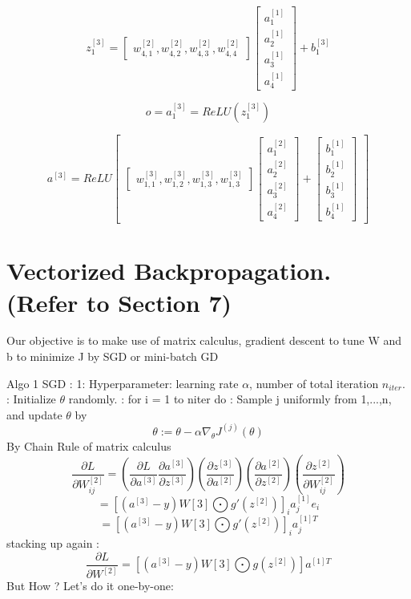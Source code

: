 \documentclass{article}
\begin{document}
\[
z_1^{[3]}=
\begin{bmatrix}
w_{4,1}^{[2]},w_{4,2}^{[2]},w_{4,3}^{[2]},w_{4,4}^{[2]}
\end{bmatrix}
\begin{bmatrix}
a_1^{[1]} \\ a_2^{[1]} \\ a_3^{[1]} \\ a_4^{[1]}
\end{bmatrix}
+ b_1^{[3]}
\]

\[ o = a_1^{[3]} = ReLU( z_1^{[3]}) \]

\[a^{[3]} = ReLU 
\begin{bmatrix}
\begin{bmatrix}
w_{1,1}^{[3]},w_{1,2}^{[3]},w_{1,3}^{[3]},w_{1,3}^{[3]}
\end{bmatrix}
\begin{bmatrix}
a_1^{[2]} \\ a_2^{[2]} \\ a_3^{[2]} \\ a_4^{[2]}
\end{bmatrix} +
\begin{bmatrix}
b_1^{[1]} \\ b_2^{[1]} \\ b_3^{[1]} \\ b_4^{[1]}
\end{bmatrix} 
\end{bmatrix}
\]




\section{Vectorized Backpropagation. (Refer to Section 7)}
Our objective is to make use of matrix calculus, gradient descent to tune W and b to minimize J by SGD or mini-batch GD \newline

Algo 1 SGD : 
 1: Hyperparameter: learning rate \(\alpha\), number of total iteration \(n_{iter}\). : Initialize \(\theta\) randomly. : for i = 1 to niter do : Sample j uniformly from {1,...,n}, and update \(\theta\) by \newline
\[ \theta := \theta - \alpha \nabla_\theta J^{(j)}(\theta) \] 
By Chain Rule of matrix calculus 
\[
\frac{\partial L }{\partial W_{ij}^{[2]}} = ( \frac{\partial L }{\partial a^{[3]}} \frac{\partial a^{[3]}}{\partial z^{[3]}} )
(\frac{\partial z^{[3]}}{\partial a^{[2]}}) ( \frac{\partial a^{[2]}}{\partial z^{[2]}})( \frac{\partial z^{[2]}}{\partial W_{ij}^{[2]}})
\]
\[
= [ (a^{[3]}-y)W[3] \bigodot g'(z^{[2]}) ]_i a_j^{[1]}e_i 
\]
\[
= [ (a^{[3]}-y)W[3] \bigodot g'(z^{[2]}) ]_i a_j^{[1]T} 
\]
stacking up again :
\[
\frac{\partial L }{\partial W^{[2]}} = [ (a^{[3]}-y)W[3] \bigodot g(z^{[2]}) ] a^{[1]T} 
\]
But How ? Let's do it one-by-one:\newline 
\end{document}
